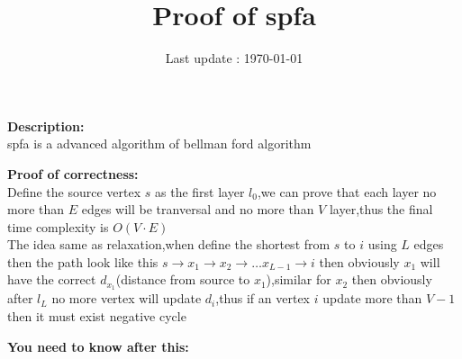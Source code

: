 \documentclass{article}
\begin{document}
\title{\textbf{Proof of spfa}}
\author{}
\date{Last update : \today}

\maketitle

\noindent \textbf{Description:}\\
spfa is a advanced algorithm of bellman ford algorithm

\noindent \textbf{Proof of correctness:}\\
Define the source vertex $s$ as the first layer $l_0$,we can prove that each layer no more than $E$ edges will be tranversal and no more than $V$ layer,thus the final time complexity is $O(V\cdot E)$\\
The idea same as relaxation,when define the shortest from $s$ to $i$ using $L$ edges then the path look like this $s\rightarrow x_1 \rightarrow x_2 \rightarrow \dots x_{L-1}\rightarrow i$ then obviously $x_1$ will have the correct $d_{x_1}$(distance from source to $x_1$),similar for $x_2$ then obviously after $l_L$ no more vertex will update $d_i$,thus if an vertex $i$ update more than $V-1$ then it must exist negative cycle

\noindent \textbf{You need to know after this:}\\
\end{document}
